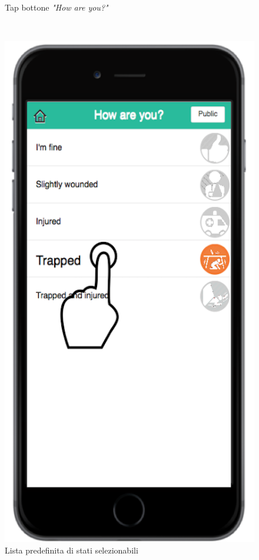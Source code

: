 \begin{figure}
\begin{minipage}[b]{6cm}
	\caption{Tap bottone \textit{"How are you?"}}
	\label{fig:buttoncomestai}
 \end{minipage}
 \ \hspace{6 mm} \hspace{7 mm} \
 \begin{minipage}[b]{6cm}
  \centering
\includegraphics[scale=0.9]{interfaccia/comestaitap.png}
	\caption{Lista predefinita di stati selezionabili}
	\label{fig:lista}
 \end{minipage}
\end{figure}

